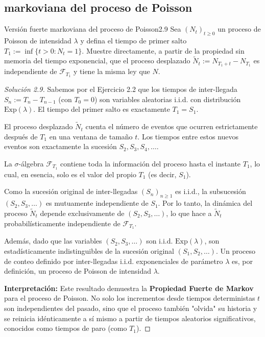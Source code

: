 \documentclass[10pt,a4paper]{article}
\begin{document}
\newpage
\subsection{markoviana del proceso de Poisson}

\begin{ejercicio}{Versión fuerte markoviana del proceso de Poisson}{2.9}
    Sea $(N_t)_{t\ge 0}$ un proceso de Poisson de intensidad $\lambda$ y defina el tiempo de primer salto $T_1 := \inf\{t > 0 : N_t = 1\}$. Muestre directamente, a partir de la propiedad sin memoria del tiempo exponencial, que el proceso desplazado $\tilde{N}_t := N_{T_1+t} - N_{T_1}$ es independiente de $\mathcal{F}_{T_1}$ y tiene la misma ley que $N$.
\end{ejercicio}

\begin{proof}[Solución 2.9]
    Sabemos por el Ejercicio 2.2 que los tiempos de inter-llegada $S_n := T_n - T_{n-1}$ (con $T_0 = 0$) son variables aleatorias i.i.d. con distribución $\text{Exp}(\lambda)$.
    El tiempo del primer salto es exactamente $T_1 = S_1$. 
    
    El proceso desplazado $\tilde{N}_t$ cuenta el número de eventos que ocurren estrictamente después de $T_1$ en una ventana de tamaño $t$. Los tiempos entre estos nuevos eventos son exactamente la sucesión $S_2, S_3, S_4, \dots$.
    
    La $\sigma$-álgebra $\mathcal{F}_{T_1}$ contiene toda la información del proceso hasta el instante $T_1$, lo cual, en esencia, solo es el valor del propio $T_1$ (es decir, $S_1$).
    
    Como la sucesión original de inter-llegadas $(S_n)_{n \ge 1}$ es i.i.d., la subsucesión $(S_2, S_3, \dots)$ es mutuamente independiente de $S_1$.
    Por lo tanto, la dinámica del proceso $\tilde{N}_t$ depende exclusivamente de $(S_2, S_3, \dots)$, lo que hace a $\tilde{N}_t$ probabilísticamente independiente de $\mathcal{F}_{T_1}$.
    
    Además, dado que las variables $(S_2, S_3, \dots)$ son i.i.d. $\text{Exp}(\lambda)$, son estadísticamente indistinguibles de la sucesión original $(S_1, S_2, \dots)$. Un proceso de conteo definido por inter-llegadas i.i.d. exponenciales de parámetro $\lambda$ es, por definición, un proceso de Poisson de intensidad $\lambda$. 
    
    \textbf{Interpretación:}
    Este resultado demuestra la \textbf{Propiedad Fuerte de Markov} para el proceso de Poisson. No solo los incrementos desde tiempos deterministas $t$ son independientes del pasado, sino que el proceso también "olvida" su historia y se reinicia idénticamente a sí mismo a partir de tiempos aleatorios significativos, conocidos como tiempos de paro (como $T_1$).
\end{proof}
\end{document}
